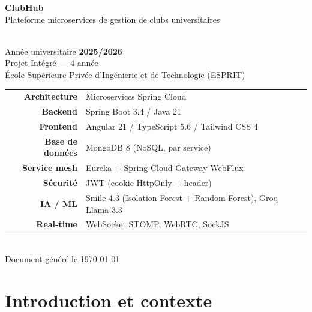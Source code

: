 \documentclass[11pt,a4paper]{report}
\begin{document}
\begin{titlepage}
  \centering
  \vspace*{1.5cm}
  {\sffamily\Huge\bfseries\color{primary} ClubHub}\\[0.4cm]
  {\sffamily\Large Plateforme microservices de gestion de clubs universitaires}\\[1.2cm]
  \\[1.5cm]
  {\Large Année universitaire \textbf{2025/2026}}\\[0.3cm]
  {\large Projet Intégré — 4 année}\\[0.3cm]
  {\large École Supérieure Privée d'Ingénierie et de Technologie (ESPRIT)}\\[2.5cm]

  \begin{tabular}{rl}
    \textbf{Architecture}    & Microservices Spring Cloud \\
    \textbf{Backend}         & Spring Boot 3.4 / Java 21 \\
    \textbf{Frontend}        & Angular 21 / TypeScript 5.6 / Tailwind CSS 4 \\
    \textbf{Base de données} & MongoDB 8 (NoSQL, par service) \\
    \textbf{Service mesh}    & Eureka + Spring Cloud Gateway WebFlux \\
    \textbf{Sécurité}        & JWT (cookie HttpOnly + header) \\
    \textbf{IA / ML}         & Smile 4.3 (Isolation Forest + Random Forest), Groq Llama 3.3 \\
    \textbf{Real-time}       & WebSocket STOMP, WebRTC, SockJS \\
  \end{tabular}\\[2cm]

  {\color{muted} Document généré le \today}
  \vfill
\end{titlepage}

\tableofcontents
\clearpage

\chapter{Introduction et contexte}
\end{document}
